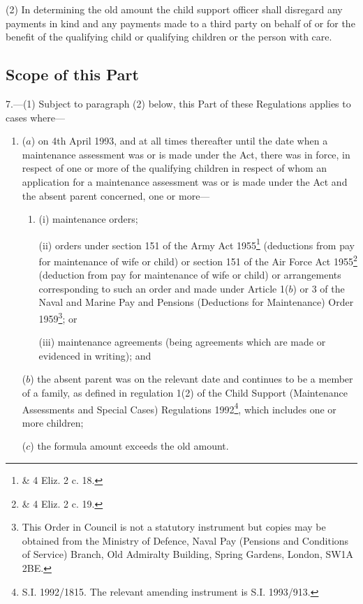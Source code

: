 \documentclass[a4paper]{article}
\begin{document}
(2) In determining the old amount the child support officer shall disregard any payments in kind and any payments made to a third party on behalf of or for the benefit of the qualifying child or qualifying children or the person with care.

\subsection[7. Scope of this Part]{Scope of this Part}

7.—(1) Subject to paragraph (2) below, this Part of these Regulations applies to cases where—
\begin{enumerate}\item[]
($a$) on 4th April 1993, and at all times thereafter until the date when a maintenance assessment was or is made under the Act, there was in force, in respect of one or more of the qualifying children in respect of whom an application for a maintenance assessment was or is made under the Act and the absent parent concerned, one or more—
\begin{enumerate}\item[]
(i) maintenance orders;

(ii) orders under section 151 of the Army Act 1955\footnote{ \& 4 Eliz. 2 c. 18.} (deductions from pay for maintenance of wife or child) or section 151 of the Air Force Act 1955\footnote{ \& 4 Eliz. 2 c. 19.} (deduction from pay for maintenance of wife or child) or arrangements corresponding to such an order and made under Article 1($b$) or 3 of the Naval and Marine Pay and Pensions (Deductions for Maintenance) Order 1959\footnote{\frenchspacing This Order in Council is not a statutory instrument but copies may be obtained from the Ministry of Defence, Naval Pay (Pensions and Conditions of Service) Branch, Old Admiralty Building, Spring Gardens, London, SW1A 2BE.}; or

(iii) maintenance agreements (being agreements which are made or evidenced in writing); and
\end{enumerate}

($b$) the absent parent was on the relevant date and continues to be a member of a family, as defined in regulation 1(2) of the Child Support (Maintenance Assessments and Special Cases) Regulations 1992\footnote{\frenchspacing S.I. 1992/1815. The relevant amending instrument is S.I. 1993/913.}, which includes one or more children;

($c$) the formula amount exceeds the old amount.
\end{enumerate}
\end{document}
